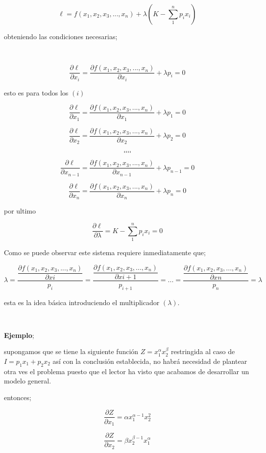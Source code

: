\documentclass[12pt]{article}
\begin{document}
{$$\ell=f(x_1,x_2,x_3,...,x_n) + \lambda(K-\sum_{1}^{n} p_{i}x_{i})$$

obteniendo las condiciones necesarias;

\

$$\dfrac{\partial \ell }{\partial x_{i}} = \dfrac{\partial f(x_1,x_2,x_3,...,x_n)}{\partial x_{i}}+\lambda p_{i}= 0$$

esto es para todos los $({i})$

$$\dfrac{\partial \ell }{\partial x_{1}} = \dfrac{\partial f(x_1,x_2,x_3,...,x_n)}{\partial x_{1}}+\lambda p_{1}= 0$$

$$\dfrac{\partial \ell }{\partial x_{2}} = \dfrac{\partial f(x_1,x_2,x_3,...,x_n)}{\partial x_{2}}+\lambda p_{2}= 0$$


$$....$$
$$....$$

$$\dfrac{\partial \ell }{\partial x_{n-1}} = \dfrac{\partial f(x_1,x_2,x_3,...,x_n)}{\partial x_{n-1}}+\lambda p_{n-1}= 0$$

$$\dfrac{\partial \ell }{\partial x_{n}} = \dfrac{\partial f(x_1,x_2,x_3,...,x_n)}{\partial x_{n}}+\lambda p_{n}= 0$$

por ultimo 

$$\dfrac{\partial \ell}{\partial \lambda} = K-\sum_{1}^{n} p_{i}x_{i} = 0$$




Como se puede observar este sistema requiere inmediatamente que; 

$$ \lambda = \dfrac{\dfrac{\partial f(x_1,x_2,x_3,...,x_n)}{\partial x{i}}}{p_{i}} =  \dfrac{\dfrac{\partial f(x_1,x_2,x_3,...,x_n)}{\partial x{i+1}}}{p_{i+1}} = ... = \dfrac{\dfrac{\partial f(x_1,x_2,x_3,...,x_n)}{\partial x{n}}}{p_{n}}= \lambda $$

esta es la idea básica introduciendo el multiplicador $(\lambda)$.

\
\

\textbf{Ejemplo}; 

supongamos que se tiene la siguiente función $ Z=x_{1}^{\alpha}x_{2}^{\beta}$ restringida al caso de $I=p_{1}x_{1}+p_{2}x_{2}$ así con la conclusión establecida, no habrá necesidad de plantear otra ves el problema puesto que el lector ha visto que acabamos de desarrollar un modelo general.

entonces; 

$$\dfrac{\partial Z}{\partial x_{1}}=\alpha x_{1}^{\alpha -1} x_{2}^{2}$$

$$\dfrac{\partial Z}{\partial x_{2}}=\beta x_{2}^{\beta -1}x_{1}^{\alpha}$$


}
\end{document}
